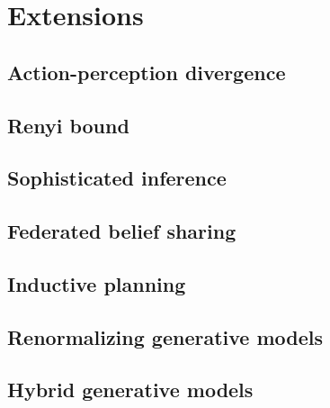 \chapter{Extensions}

\section{Action-perception divergence}
\section{Renyi bound}
\section{Sophisticated inference}
\section{Federated belief sharing}
\section{Inductive planning}
\section{Renormalizing generative models}
\section{Hybrid generative models}